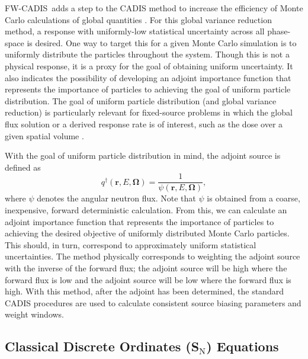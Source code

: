\documentclass{article} %
\newcommand{\bo}{\mathbf\Omega}
\newcommand{\vecr}{\textbf{r}}
\newcommand{\sn}{S$_\mathrm{N}$}
\newcommand{\fwc}{\mbox{FW-CADIS}}
\begin{document}
\fwc\ adds a step to the CADIS method to increase the efficiency of Monte
Carlo calculations of global quantities \cite{fwcadis}. For this global
variance reduction method, a response with uniformly-low statistical
uncertainty across all phase-space is desired. One way to target this for a
given Monte Carlo simulation is to uniformly distribute the particles
throughout the system. Though this is not a physical response, it is a proxy
for the goal of obtaining uniform uncertainty. It also indicates the
possibility of developing an adjoint importance function that represents the
importance of particles to achieving the goal of uniform particle
distribution. The goal of uniform particle distribution (and global variance
reduction) is particularly relevant for fixed-source problems in which the
global flux solution or a derived response rate is of interest, such as the
dose over a given spatial volume \cite{wilsonslaybaugh}.

With the goal of uniform particle distribution in mind, the adjoint source is
defined as
%
\begin{equation}
q^{\dagger}(\vecr,E,\bo) = \frac{1}{\psi(\vecr,E,\bo)},
\end{equation}
%
where $\psi$ denotes the angular neutron flux. Note that $\psi$ is obtained
from a coarse, inexpensive, forward deterministic calculation. From this, we
can calculate an adjoint importance function that represents the importance of
particles to achieving the desired objective of uniformly distributed Monte
Carlo particles. This should, in turn, correspond to approximately uniform
statistical uncertainties. The method physically corresponds to weighting the
adjoint source with the inverse of the forward flux; the adjoint source will
be high where the forward flux is low and the adjoint source will be low where
the forward flux is high. With this method, after the adjoint has been
determined, the standard CADIS procedures are used to calculate consistent
source biasing parameters and weight windows.

\subsection{Classical Discrete Ordinates (\sn) Equations}
\end{document}
